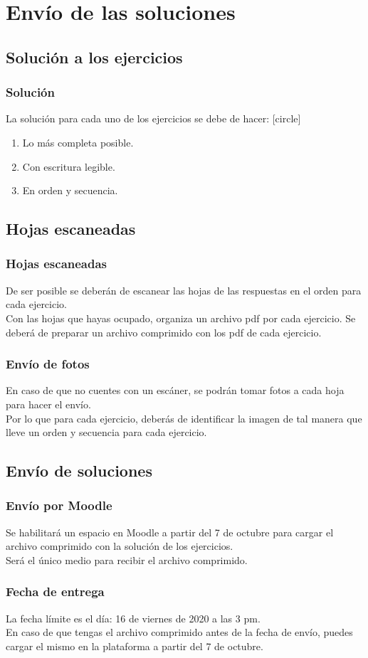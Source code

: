 \section{Envío de las soluciones}
\subsection{Solución a los ejercicios}
\begin{frame}
\frametitle{Solución}
La solución para cada uno de los ejercicios se debe de hacer:
[circle]
\begin{enumerate}[<+->]
\item Lo más completa posible.
\item Con escritura legible.
\item En orden y secuencia.
\end{enumerate}
\end{frame}
\subsection{Hojas escaneadas}
\begin{frame}
\frametitle{Hojas escaneadas}
De ser posible se deberán de escanear las hojas de las respuestas en el orden para cada ejercicio.
\\
\bigskip
Con las hojas que hayas ocupado, organiza un archivo pdf por cada ejercicio. Se deberá de preparar un archivo comprimido con los pdf de cada ejercicio.
\end{frame}
\begin{frame}
\frametitle{Envío de fotos}
En caso de que no cuentes con un escáner, se podrán tomar fotos a cada hoja para hacer el envío.
\\
\bigskip
Por lo que para cada ejercicio, deberás de identificar la imagen de tal manera que lleve un orden y secuencia para cada ejercicio.
\end{frame}
\subsection{Envío de soluciones}
\begin{frame}
\frametitle{Envío por Moodle}
Se habilitará un espacio en Moodle a partir del 7 de octubre para cargar el archivo comprimido con la solución de los ejercicios.
\\
\bigskip
Será el único medio para recibir el archivo comprimido.
\end{frame}
\begin{frame}
\frametitle{Fecha de entrega}
La fecha límite es el día: 16 de viernes de 2020 a las 3 pm.
\\
\bigskip
En caso de que tengas el archivo comprimido antes de la fecha de envío, puedes cargar el mismo en la plataforma a partir del 7 de octubre.
\end{frame}
